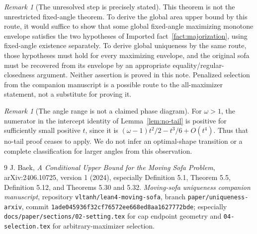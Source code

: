 \documentclass[11pt]{article}
\theoremstyle{remark}\newtheorem{remark}[theorem]{Remark}
\begin{document}
\begin{remark}[The unresolved step is precisely stated]
This theorem is not the unrestricted fixed-angle theorem. To derive the global area upper bound by this route, it would suffice to show that some global fixed-angle maximizing monotone envelope satisfies the two hypotheses of Imported fact~\ref{fact:majorization}, using fixed-angle existence separately. To derive global uniqueness by the same route, those hypotheses must hold for every maximizing envelope, and the original sofa must be recovered from its envelope by an appropriate equality/regular-closedness argument. Neither assertion is proved in this note. Penalized selection from the companion manuscript is a possible route to the all-maximizer statement, not a substitute for proving it.
\end{remark}

\begin{remark}[The angle range is not a claimed phase diagram]
For $\omega>1$, the numerator in the intercept identity of Lemma~\ref{lem:no-tail} is positive for sufficiently small positive $t$, since it is $(\omega-1)t^2/2-t^3/6+O(t^4)$. Thus that no-tail proof ceases to apply. We do not infer an optimal-shape transition or a complete classification for larger angles from this observation.
\end{remark}

\begin{thebibliography}{9}
 J. Baek, \emph{A Conditional Upper Bound for the Moving Sofa Problem}, arXiv:2406.10725, version 1 (2024), especially Definition 5.1, Theorem 5.5, Definition 5.12, and Theorems 5.30 and 5.32.
 \emph{Moving-sofa uniqueness companion manuscript}, repository \texttt{vltanh/lean4-moving-sofa}, branch \texttt{paper/uniqueness-arxiv}, commit \texttt{1ade045936f32cf76572ee668ed8aa1627772bde}; especially \texttt{docs/paper/sections/02-setting.tex} for cap endpoint geometry and \texttt{04-selection.tex} for arbitrary-maximizer selection.
\end{thebibliography}
\end{document}
